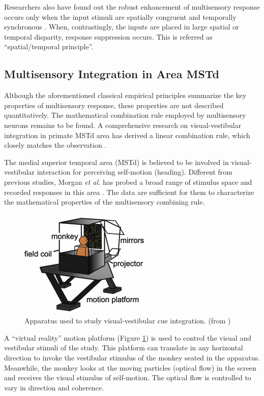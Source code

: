 \documentclass{article}[11pt]
\newcommand{\etal}{\textit{et al. }}
\begin{document}
Researchers also have found out the robust enhancement of multisensory response occurs only when the input stimuli are spatially congruent and temporally synchronous \cite{meredith_determinants_1987, meredith_spatial_1996}. When, contrastingly, the inputs are placed in large spatial or temporal disparity, response suppression occurs. This is referred as ``spatial/temporal principle''.

\subsection{Multisensory Integration in Area MSTd}
Although the aforementioned classical empirical principles summarize the key properties of multisensory response, these properties are not described quantitatively. The mathematical combination rule employed by multisensory neurons remains to be found. A comprehensive research on visual-vestibular integration in primate MSTd area has derived a linear combination rule, which closely matches the observation \cite{morgan_multisensory_2008}.

The medial superior temporal area (MSTd) is believed to be involved in visual-vestibular interaction for perceiving self-motion (heading). Different from previous studies, Morgan \etal has probed a broad range of stimulus space and recorded responses in this area \cite{morgan_multisensory_2008}. The data are sufficient for them to characterize the mathematical properties of the multisensory combining rule.

\begin{figure}[tpb]
  \centering
  \includegraphics[scale=.6]{apparatus}
  \caption{Apparatus used to study visual-vestibular cue integration. (from \cite{fetsch_visualvestibular_2010})}
  \label{fig:apparatus}
\end{figure}

A ``virtual reality'' motion platform (Figure \ref{fig:apparatus}) is used to control the visual and vestibular stimuli of the study. 
This platform can translate in any horizontal direction to invoke the vestibular stimulus of the monkey seated in the apparatus. Meanwhile, the monkey looks at the moving particles (optical flow) in the screen and receives the visual stimulus of self-motion. The optical flow is controlled to vary in direction and coherence.
\end{document}
